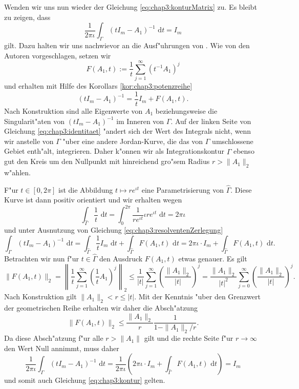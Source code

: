 Wenden wir uns nun wieder der Gleichung \eqref{eq:chap3:konturMatrix} zu. Es bleibt zu zeigen, dass
\begin{equation}\label{eq:chap3:identitaet}
\frac{1}{2\pi\iota}\int_\Gamma (t I_m - A_1)^{-1} \text{ d}t = I_m
\end{equation}
gilt. Dazu halten wir uns nachwievor an die Ausf"uhrungen von \cite[Abschnitt 4.9]{liesen}. Wie von den Autoren vorgeschlagen, setzen wir
\[
F(A_1,t) := \frac{1}{t}\sum_{j=1}^\infty(t^{-1}A_1)^j
\]
und erhalten mit Hilfe des Korollars \ref{kor:chap3:potenzreihe}
\begin{equation}\label{eq:chap3:resolventenZerlegung}
(t I_m - A_1)^{-1} = \frac{1}{t} I_m + F(A_1,t).
\end{equation}
Nach Konstruktion sind alle Eigenwerte von $A_1$ beziehungsweise die Singularit"aten von $(t I_m - A_1)^{-1}$ im Inneren von $\Gamma$. Auf der linken Seite von Gleichung \eqref{eq:chap3:identitaet} "andert sich der Wert des Integrals nicht, wenn wir anstelle von $\Gamma$ "uber eine
andere Jordan-Kurve, die das von $\Gamma$ umschlossene Gebiet enth"alt, integrieren. Daher k"onnen wir als Integrationskontur  $\widehat{\Gamma}$ ebenso gut den Kreis um den Nullpunkt mit hinreichend gro"sem Radius $r > \|A_1\|_2$
w"ahlen.

\newpage

F"ur $t\in[0,2\pi]$ ist die Abbildung $t\mapsto re^{\iota t}$ eine Parametrisierung von $\widehat{\Gamma}$. Diese Kurve ist dann positiv orientiert und wir erhalten wegen
\[
\int_{\widehat{\Gamma}} \frac{1}{t} \text{ d}t = \int_0^{2\pi}\frac{1}{r e^{\iota t}} \iota r e^{\iota t} \text{ d}t = 2\pi \iota
\]
und unter Ausnutzung von Gleichung \eqref{eq:chap3:resolventenZerlegung}
\[
\int_\Gamma (t I_m - A_1)^{-1} \text{ d}t =
\int_{\widehat{\Gamma}} \frac{1}{t}I_m
\text{ d}t
+ \int_{\widehat{\Gamma}} F(A_1,t) \text{ d}t
= 2\pi\iota \cdot I_m + \int_{\widehat{\Gamma}} F(A_1,t) \text{ d}t.
\]
Betrachten wir nun f"ur $t \in\widehat{\Gamma}$ den Ausdruck $F(A_1,t)$ etwas genauer.
Es gilt
\[
\|F(A_1,t)\|_2 =
\left\| \frac{1}{t} \sum_{j=1}^\infty \left( \frac{1}{t} A_1 \right)^j \right\|_2
\le \frac{1}{|t|} \sum_{j=1}^\infty \left(\frac{\|A_1\|_2}{|t|} \right)^j
= \frac{\|A_1\|_2}{|t|^2}\sum_{j=0}^\infty \left(\frac{\|A_1\|_2}{|t|} \right)^j.
\]
Nach Konstruktion gilt $\|A_1\|_2 < r \le |t|$.
Mit der Kenntnis "uber den Grenzwert der geometrischen Reihe erhalten wir daher die Absch"atzung
\[
\|F(A_1,t)\|_2 \le \frac{\| A_1 \|_2}{r}
\frac{1}{1-\|A_1\|_2 / r}.
\]
Da diese Absch"atzung f"ur alle $r > \|A_1\|$ gilt und die rechte Seite f"ur $r\to\infty$ den Wert Null annimmt, muss daher
\[
\frac{1}{2\pi\iota}\int_\Gamma (t I_m - A_1)^{-1} \text{ d}t =
 \frac{1}{2\pi\iota} \left(2\pi\iota \cdot I_m + \int_{\widehat{\Gamma}} F(A_1,t) \text{ d}t\right)
= I_m
\]
und somit auch Gleichung \eqref{eq:chap3:kontur} gelten.\\

